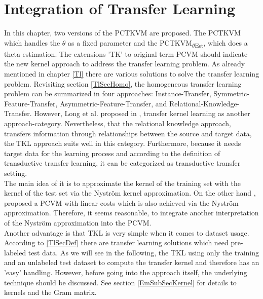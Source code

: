 \chapter{Integration of Transfer Learning}\label{In}
In this chapter, two versions of the \ac{PCTKVM} are proposed.
The \acs{PCTKVM} which handles the $\theta$ as a fixed parameter and the \acs{PCTKVM}\textsubscript{$\theta$Est}, which does a theta estimation.
The extensions 'TK' to original term \acs{PCVM} should indicate the new kernel approach to address the transfer learning problem.
As already mentioned in chapter \ref{Tl} there are various solutions to solve the transfer learning problem.
Revisiting section \ref{TlSecHomo}, the homogeneous transfer learning problem can be summarized in four approaches: Instance-Transfer, Symmetric-Feature-Transfer, Asymmetric-Feature-Transfer, and Relational-Knowledge-Transfer.\newline
However, Long et al. proposed in \cite{Long.2015}, transfer kernel learning as another approach-category.
Nevertheless, that the relational knowledge approach, transfers information through relationships between the source and target data, the \acs{TKL} approach suits well in this category.
Furthermore, because it needs target data for the learning process and according to the definition of transductive transfer learning, it can be categorized as transductive transfer setting.\\
The main idea of it is to approximate the kernel of the training set with the kernel of the test set via the Nyström kernel approximation.\cite{Long.2015}
On the other hand \cite{Schleif.2015}, proposed a \acs{PCVM} with linear costs which is also achieved via the Nyström approximation.
Therefore, it seems reasonable, to integrate another interpretation of the Nyström approximation into the \acs{PCVM}.\\
Another advantage is that \acs{TKL} is very simple when it comes to dataset usage.
According to \ref{TlSecDef} there are transfer learning solutions which need pre-labeled test data.
As we will see in the following, the \acs{TKL} using only the training and an unlabeled test dataset to compute the transfer kernel and therefore has an 'easy' handling.\newline
However, before going into the approach itself, the underlying technique should be discussed.
See section \ref{EmSubSecKernel} for details to kernels and the Gram matrix.
